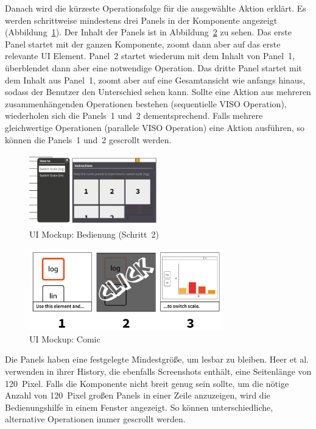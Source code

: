 \documentclass[
	headsepline,
	footsepline,
	fontsize=12pt,
	bibliography=totoc
]{scrbook}
\begin{document}
Danach wird die kürzeste Operationsfolge für die ausgewählte Aktion erklärt. Es werden schrittweise mindestens drei Panels in der Komponente angezeigt (Abbildung~\ref{figure:bedienung-step2}). Der Inhalt der Panels ist in Abbildung~\ref{figure:bedienung-comic} zu sehen. Das erste Panel startet mit der ganzen Komponente, zoomt dann aber auf das erste relevante UI Element. Panel~2 startet wiederum mit dem Inhalt von Panel~1, überblendet dann aber eine notwendige Operation. Das dritte Panel startet mit dem Inhalt aus Panel~1, zoomt aber auf eine Gesamtansicht wie anfangs hinaus, sodass der Benutzer den Unterschied sehen kann. Sollte eine Aktion aus mehreren zusammenhängenden Operationen bestehen (sequentielle VISO Operation), wiederholen sich die Panels~1 und~2 dementsprechend. Falls mehrere gleichwertige Operationen (parallele VISO Operation) eine Aktion ausführen, so können die Panels~1 und~2 gescrollt werden.

\begin{figure}[htbp]
   \centering
   \includegraphics[width=0.5\textwidth]{images/konzeption-bedienung-step2.png}
   \caption{UI Mockup: Bedienung (Schritt~2)}
   \label{figure:bedienung-step2}
\end{figure}

\begin{figure}[htbp]
   \centering
   \includegraphics[width=0.75\textwidth]{images/konzeption-bedienung-comic.png}
   \caption{UI Mockup: Comic}
   \label{figure:bedienung-comic}
\end{figure}

Die Panels haben eine festgelegte Mindestgröße, um lesbar zu bleiben. Heer et al. \cite{Heer2008} verwenden in ihrer History, die ebenfalls Screenshots enthält, eine Seitenlänge von 120~Pixel. Falls die Komponente nicht breit genug sein sollte, um die nötige Anzahl von 120~Pixel großen Panels in einer Zeile anzuzeigen, wird die Bedienungshilfe in einem Fenster angezeigt. So können unterschiedliche, alternative Operationen immer gescrollt werden.
\end{document}
